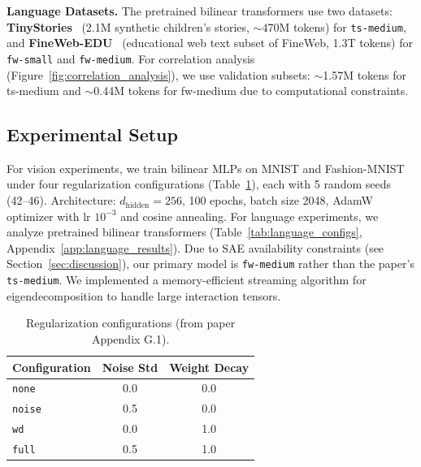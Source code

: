 \textbf{Language Datasets.}
The pretrained bilinear transformers use two datasets:
\textbf{TinyStories}~\citep{eldan2023tinystories} (2.1M synthetic children's stories, $\sim$470M tokens) for \texttt{ts-medium}, and
\textbf{FineWeb-EDU}~\citep{penedo2024fineweb} (educational web text subset of FineWeb, 1.3T tokens) for \texttt{fw-small} and \texttt{fw-medium}.
For correlation analysis (Figure~\ref{fig:correlation_analysis}), we use validation subsets: $\sim$1.57M tokens for ts-medium and $\sim$0.44M tokens for fw-medium due to computational constraints.

\subsection{Experimental Setup}

For vision experiments, we train bilinear MLPs on MNIST and Fashion-MNIST under four regularization configurations (Table~\ref{tab:reg_configs}), each with 5 random seeds (42--46).
Architecture: $d_{\text{hidden}} = 256$, 100 epochs, batch size 2048, AdamW optimizer with lr $10^{-3}$ and cosine annealing.
For language experiments, we analyze pretrained bilinear transformers (Table~\ref{tab:language_configs}, Appendix~\ref{app:language_results}).
Due to SAE availability constraints (see Section~\ref{sec:discussion}), our primary model is \texttt{fw-medium} rather than the paper's \texttt{ts-medium}.
We implemented a memory-efficient streaming algorithm for eigendecomposition to handle large interaction tensors.

\begin{table}[h]
    \caption{Regularization configurations (from paper Appendix G.1).}
    \label{tab:reg_configs}
    \centering
    \small
    \begin{tabular}{lcc}
        \toprule
        Configuration & Noise Std & Weight Decay \\
        \midrule
        \texttt{none} & 0.0 & 0.0 \\
        \texttt{noise} & 0.5 & 0.0 \\
        \texttt{wd} & 0.0 & 1.0 \\
        \texttt{full} & 0.5 & 1.0 \\
        \bottomrule
    \end{tabular}
\end{table}
